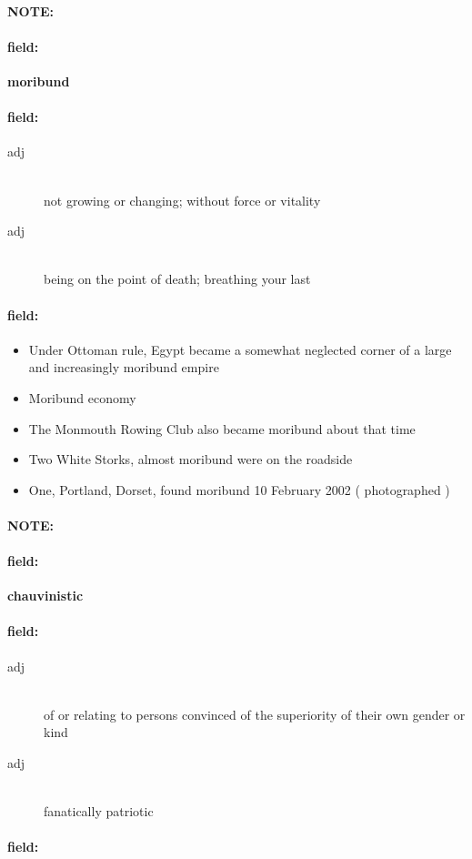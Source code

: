 \documentclass[12pt]{article}
\newenvironment{note}{\paragraph{NOTE:}}{}
\newenvironment{field}{\paragraph{field:}}{}
\begin{document}
\begin{note}
\begin{field}
\textbf{\large moribund}
\end{field}


\begin{field}
\begin{description}
\item[adj] \hfill \\ 
not growing or changing; without force or vitality

\item[adj] \hfill \\ 
being on the point of death; breathing your last

\end{description}
\end{field}

\begin{field}
\begin{itemize}
\item Under Ottoman rule, Egypt became a somewhat neglected corner of a large and increasingly moribund empire
\item Moribund economy
\item The Monmouth Rowing Club also became moribund about that time
\item Two White Storks, almost moribund were on the roadside
\item One, Portland, Dorset, found moribund 10 February 2002 ( photographed )
\end{itemize}
\end{field}
\end{note}
\begin{note}
\begin{field}
\textbf{\large chauvinistic}
\end{field}


\begin{field}
\begin{description}
\item[adj] \hfill \\ 
of or relating to persons convinced of the superiority of their own gender or kind

\item[adj] \hfill \\ 
fanatically patriotic

\end{description}
\end{field}

\begin{field}
\end{field}
\end{note}
\end{document}
